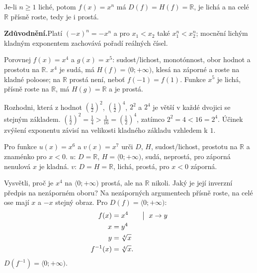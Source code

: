 \documentclass[11pt,a4paper]{article}
\begin{document}
\begin{zadaniBox}[title={Věta - Vlastnosti lichých mocnin}]
Je-li $n\ge1$ liché, potom $f(x)=x^n$ má $D(f)=H(f)=\mathbb R$, je lichá a na celé $\mathbb R$ přísně roste, tedy je i prostá.
\end{zadaniBox}
\noindent\textbf{Zdůvodnění.}\enspace Platí $(-x)^n=-x^n$ a pro $x_1<x_2$ také $x_1^n<x_2^n$; mocnění lichým kladným exponentem zachovává pořadí reálných čísel.


\begin{prikladReseniBox}[title={Příklad 1}]
Porovnej $f(x)=x^4$ a $g(x)=x^5$: sudost/lichost, monotónnost, obor hodnot a prostotu na $\mathbb R$.
\tcblower
$x^4$ je sudá, má $H(f)=\langle0;+\infty)$, klesá na záporné a roste na kladné poloose; na $\mathbb R$ prostá není, neboť $f(-1)=f(1)$. Funkce $x^5$ je lichá, přísně roste na $\mathbb R$, má $H(g)=\mathbb R$ a je prostá.
\end{prikladReseniBox}

\begin{prikladReseniBox}[title={Příklad 2}]
Rozhodni, která z hodnot $\left(\frac{1}{2}\right)^2$, $\left(\frac{1}{2}\right)^4$, $2^2$ a $2^4$ je větší v každé dvojici se stejným základem.
\tcblower
$\left(\frac{1}{2}\right)^2=\frac{1}{4}>\frac{1}{16}=\left(\frac{1}{2}\right)^4$, zatímco $2^2=4<16=2^4$. Účinek zvýšení exponentu závisí na velikosti kladného základu vzhledem k $1$.
\end{prikladReseniBox}

\begin{zadaniReseniBox}[title={Samostatná práce 1}]
Pro funkce $u(x)=x^6$ a $v(x)=x^7$ urči $D$, $H$, sudost/lichost, prostotu na $\mathbb R$ a znaménko pro $x<0$.
\tcblower
$u$: $D=\mathbb R$, $H=\langle0;+\infty)$, sudá, neprostá, pro záporná nenulová $x$ je kladná. $v$: $D=H=\mathbb R$, lichá, prostá, pro $x<0$ záporná.
\end{zadaniReseniBox}

\begin{zadaniReseniBox}[title={Rozšíření 1}]
Vysvětli, proč je $x^4$ na $\langle0;+\infty)$ prostá, ale na $\mathbb R$ nikoli. Jaký je její inverzní předpis na nezáporném oboru?
\tcblower
Na nezáporných argumentech přísně roste, na celé ose mají $x$ a $-x$ stejný obraz. Pro $D(f)=\langle0;+\infty)$:
\[
\begin{aligned}
f(x)&=x^4 &&\bigm|\ x\to y\\
x&=y^4\\
y&=\sqrt[4]{x}\\
f^{-1}(x)&=\sqrt[4]{x}.
\end{aligned}
\]
$D(f^{-1})=\langle0;+\infty)$.
\end{zadaniReseniBox}
\end{document}
